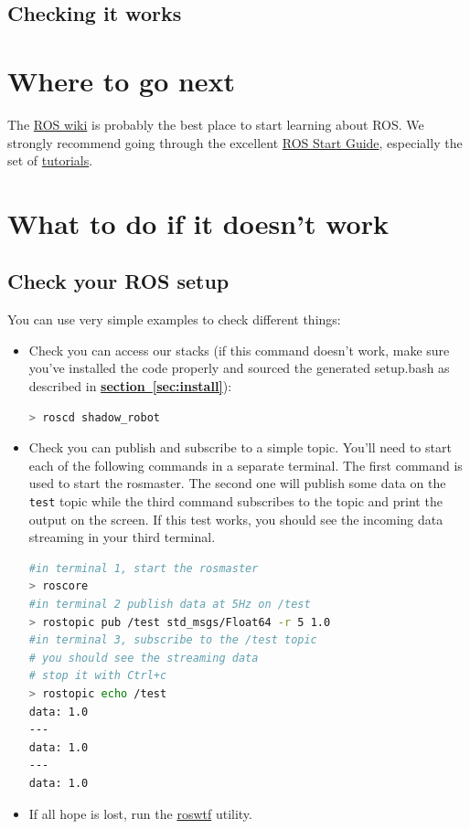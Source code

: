 \documentclass[12pt]{article}
\newcommand{\link}[1]{\hyperref[sec:#1]{\textbf{section~\ref*{sec:#1}}}}
\begin{document}
\subsection{Checking it works}
\label{sec:checking-it-works}

\newpage

\section{Where to go next}
\label{sec:where-to-go}
\par The \href{http://ros.org/wiki}{ROS wiki} is probably the best place to start learning about ROS. We strongly recommend going through the excellent \href{http://ros.org/wiki/ROS/StartGuide}{ROS Start Guide}, especially the set of \href{http://ros.org/wiki/ROS/Tutorials}{tutorials}.

\newpage

\section{What to do if it doesn't work}
\label{sec:what-do-if}

\subsection{Check your ROS setup}
\par You can use very simple examples to check different things:
\begin{itemize}
\item Check you can access our stacks (if this command doesn't work, make sure you've installed the code properly and sourced the generated setup.bash as described in \link{install}):
  \begin{lstlisting}[escapeinside='', language=Bash]
> roscd shadow_robot
  \end{lstlisting}

\item Check you can publish and subscribe to a simple topic. You'll need to start each of the following commands in a separate terminal. The first command is used to start the rosmaster. The second one will publish some data on the \texttt{test} topic while the third command subscribes to the topic and print the output on the screen. If this test works, you should see the incoming data streaming in your third terminal.

  \begin{lstlisting}[escapeinside='', language=Bash]
#in terminal 1, start the rosmaster
> roscore
#in terminal 2 publish data at 5Hz on /test
> rostopic pub /test std_msgs/Float64 -r 5 1.0
#in terminal 3, subscribe to the /test topic
# you should see the streaming data
# stop it with Ctrl+c
> rostopic echo /test
data: 1.0
---
data: 1.0
---
data: 1.0
  \end{lstlisting}

\item If all hope is lost, run the \href{http://ros.org/wiki/roswtf}{roswtf} utility.
\end{itemize}
\end{document}
